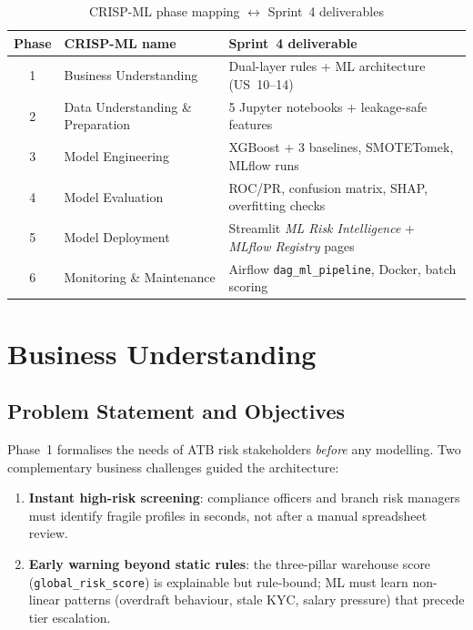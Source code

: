 \begin{table}[H]
\centering
\caption{CRISP-ML phase mapping $\leftrightarrow$ Sprint~4 deliverables}
\label{tab:crispml-mapping-atb}
\begin{tabular}{|c|l|l|}
\hline
\textbf{Phase} & \textbf{CRISP-ML name} & \textbf{Sprint~4 deliverable} \\
\hline
1 & Business Understanding & Dual-layer rules + ML architecture (US~10--14) \\
2 & Data Understanding \& Preparation & 5 Jupyter notebooks + leakage-safe features \\
3 & Model Engineering & XGBoost + 3 baselines, SMOTETomek, MLflow runs \\
4 & Model Evaluation & ROC/PR, confusion matrix, SHAP, overfitting checks \\
5 & Model Deployment & Streamlit \emph{ML Risk Intelligence} + \emph{MLflow Registry} pages \\
6 & Monitoring \& Maintenance & Airflow \texttt{dag\_ml\_pipeline}, Docker, batch scoring \\
\hline
\end{tabular}
\end{table}
\section{Business Understanding}
\label{sec:phase1_business}

\subsection{Problem Statement and Objectives}

Phase~1 formalises the needs of ATB risk stakeholders \emph{before} any modelling.
Two complementary business challenges guided the architecture:

\begin{enumerate}
    \item \textbf{Instant high-risk screening}: compliance officers and branch risk
          managers must identify fragile profiles in seconds, not after a manual
          spreadsheet review.
    \item \textbf{Early warning beyond static rules}: the three-pillar warehouse
          score (\texttt{global\_risk\_score}) is explainable but rule-bound; ML
          must learn non-linear patterns (overdraft behaviour, stale KYC, salary
          pressure) that precede tier escalation.
\end{enumerate}

